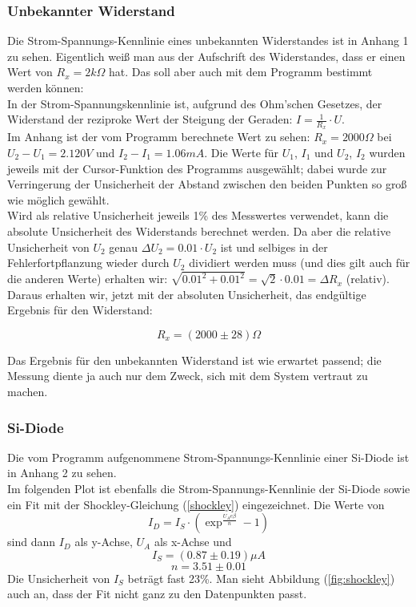 \documentclass[12pt,a4paper,twopage]{article}
\begin{document}
\subsubsection{Unbekannter Widerstand}
Die Strom-Spannungs-Kennlinie eines unbekannten Widerstandes ist in Anhang 1 zu sehen. Eigentlich weiß man aus der Aufschrift des Widerstandes, dass er einen Wert von $R_x=2 k\Omega$ hat. Das soll aber auch mit dem Programm bestimmt werden können:\\
In der Strom-Spannungskennlinie ist, aufgrund des Ohm'schen Gesetzes, der Widerstand der reziproke Wert der Steigung der Geraden: $I=\frac{1}{R_x}\cdot U$. \\
Im Anhang ist der vom Programm berechnete Wert zu sehen: $R_x=2000\Omega$ bei $U_2-U_1=2.120\si{V}$ und $I_2-I_1=1.06\si{mA}$. Die Werte für $U_1$, $I_1$ und $U_2$, $I_2$ wurden jeweils mit der Cursor-Funktion des Programms ausgewählt; dabei wurde zur Verringerung der Unsicherheit der Abstand zwischen den beiden Punkten so groß wie möglich gewählt.\\
Wird als relative Unsicherheit jeweils 1\% des Messwertes verwendet, kann die absolute Unsicherheit des Widerstands berechnet werden. Da aber die relative Unsicherheit von $U_2$ genau $\Delta U_2=0.01\cdot U_2$ ist und selbiges in der Fehlerfortpflanzung wieder durch $U_2$ dividiert werden muss (und dies gilt auch für die anderen Werte) erhalten wir:
$\sqrt{0.01^2 + 0.01^2}=\sqrt{2}\cdot0.01=\Delta R_x$ (relativ).
Daraus erhalten wir, jetzt mit der absoluten Unsicherheit, das endgültige Ergebnis für den Widerstand: 

$$\boxed{R_x=(2000 \pm 28)\Omega}$$

Das Ergebnis für den unbekannten Widerstand ist wie erwartet passend; die Messung diente ja auch nur dem Zweck, sich mit dem System vertraut zu machen.


\subsubsection{Si-Diode}
Die vom Programm aufgenommene Strom-Spannungs-Kennlinie einer Si-Diode ist in Anhang 2 zu sehen.\\
Im folgenden Plot ist ebenfalls die Strom-Spannungs-Kennlinie der Si-Diode sowie ein Fit mit der Shockley-Gleichung (\ref{shockley}) eingezeichnet. 
Die Werte von 
$$I_D=I_S\cdot\left(\exp^{\frac{U_A e \beta}{n}}-1\right)$$
sind dann $I_D$ als y-Achse, $U_A$ als x-Achse und 
$$I_S=(0.87 \pm 0.19)\mu A$$
$$n=3.51 \pm 0.01$$
Die Unsicherheit von $I_S$ beträgt fast 23\%. Man sieht Abbildung (\ref{fig:shockley}) auch an, dass der Fit nicht ganz zu den Datenpunkten passt. 
\end{document}
